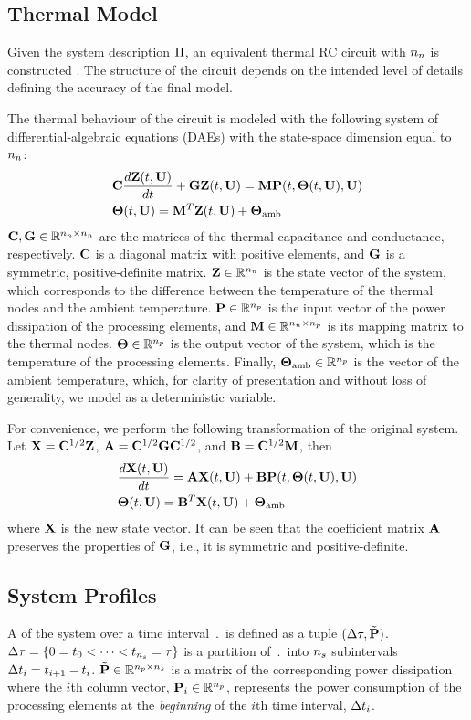 \subsection{Thermal Model}
Given the system description $\Pi$, an equivalent thermal RC circuit with ${n_n}$  is constructed \cite{kreith2000}. The structure of the circuit depends on the intended level of details defining the accuracy of the final model.

The thermal behaviour of the circuit is modeled with the following system of differential-algebraic equations (DAEs) with the state-space dimension equal to ${n_n}$:
\begin{align*}
  & \mC \frac{d\vTI(\t, \vU)}{d\t} + \mG \vTI(\t, \vU) = \mM \vP(\t, \vTO(\t, \vU), \vU) \\
  & \vTO(\t, \vU) = \mM^T \vTI(\t, \vU) + \vTO_\amb
\end{align*}
$\mC, \mG \in \real^{\nodes \times \nodes}$ are the matrices of the thermal capacitance and conductance, respectively. $\mC$ is a diagonal matrix with positive elements, and $\mG$ is a symmetric, positive-definite matrix. $\mathbf{Z} \in \mathbb{R}^{n_n}$ is the state vector of the system, which corresponds to the difference between the temperature of the thermal nodes and the ambient temperature. $\mathbf{P} \in \mathbb{R}^{n_p}$ is the input vector of the power dissipation of the processing elements, and $\mM \in \real^{\nodes \times \cores}$ is its mapping matrix to the thermal nodes. ${\boldsymbol\Theta} \in \mathbb{R}^{n_p}$ is the output vector of the system, which is the temperature of the processing elements. Finally, ${\boldsymbol\Theta}_{\text{amb}} \in \mathbb{R}^{n_p}$ is the vector of the ambient temperature, which, for clarity of presentation and without loss of generality, we model as a deterministic variable.

For convenience, we perform the following transformation of the original system. Let $\vX = \mC^{1/2} \vTI$, $\mA = \mC^{1/2} \mG \mC^{1/2}$, and $\mB = \mC^{1/2} \mM$, then
\begin{align}
  & \frac{d\vX(\t, \vU)}{d\t} = \mA \vX(\t, \vU) + \mB \vP(\t, \vTO(\t, \vU), \vU) \elabel{fourier} \\
  & \vTO(\t, \vU) = \mB^T \vX(\t, \vU) + \vTO_\amb \nonumber
\end{align}
where $\mathbf{X}$ is the new state vector. It can be seen that the coefficient matrix $\mA$ preserves the properties of $\mG$, i.e., it is symmetric and positive-definite.

\subsection{System Profiles}
A  of the system over a time interval $\period$ is defined as a tuple $\pP$. $\Delta \tau = \{ 0 = t_0 < \dots < t_{{n_s}} = \tau \}$ is a partition of $\period$ into ${n_s}$ subintervals $\Delta t_i = t_{i+1} - t_i$. $\mP \in \real^{\cores \times \steps}$ is a matrix of the corresponding power dissipation where the $i$th column vector, $\mathbf{P}_i \in \mathbb{R}^{n_p}$, represents the power consumption of the processing elements at the \emph{beginning} of the $i$th time interval, $\Delta t_i$.

